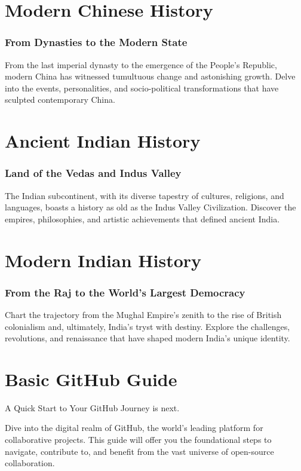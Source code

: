 \documentclass[a4paper,12pt]{book}
\begin{document}
\chapter{Modern Chinese History}
\subsection*{From Dynasties to the Modern State}
From the last imperial dynasty to the emergence of the People's Republic, modern China has witnessed tumultuous change and astonishing growth. Delve into the events, personalities, and socio-political transformations that have sculpted contemporary China.

\chapter{Ancient Indian History}
\subsection*{Land of the Vedas and Indus Valley}
The Indian subcontinent, with its diverse tapestry of cultures, religions, and languages, boasts a history as old as the Indus Valley Civilization. Discover the empires, philosophies, and artistic achievements that defined ancient India.

\chapter{Modern Indian History}
\subsection*{From the Raj to the World's Largest Democracy}
Chart the trajectory from the Mughal Empire's zenith to the rise of British colonialism and, ultimately, India's tryst with destiny. Explore the challenges, revolutions, and renaissance that have shaped modern India's unique identity.



\appendix
\chapter{Basic GitHub Guide}
A Quick Start to Your GitHub Journey is next.

Dive into the digital realm of GitHub, the world's leading platform for collaborative projects. This guide will offer you the foundational steps to navigate, contribute to, and benefit from the vast universe of open-source collaboration.
\end{document}
